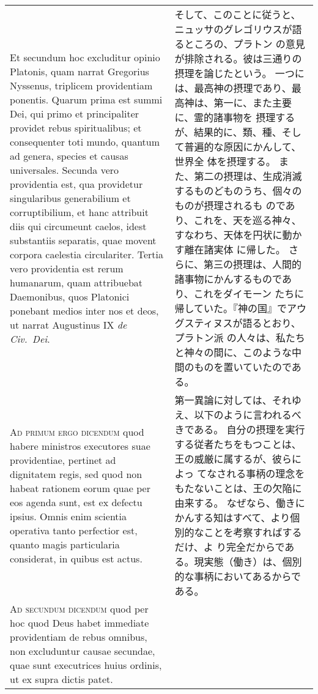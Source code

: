 \documentclass[10pt]{jsarticle} %
\begin{document}
\begin{longtable}{p{21em}p{21em}}
\\

Et secundum hoc
excluditur opinio Platonis, quam narrat Gregorius Nyssenus, triplicem
providentiam ponentis. Quarum prima est summi Dei, qui primo et
principaliter providet rebus spiritualibus; et consequenter toti mundo,
quantum ad genera, species et causas universales. Secunda vero
providentia est, qua providetur singularibus generabilium et
corruptibilium, et hanc attribuit diis qui circumeunt caelos, idest
substantiis separatis, quae movent corpora caelestia
circulariter. Tertia vero providentia est rerum humanarum, quam
attribuebat Daemonibus, quos Platonici ponebant medios inter nos et
deos, ut narrat Augustinus IX {\itshape de Civ.~Dei}.

&

そして、このことに従うと、ニュッサのグレゴリウスが語るところの、プラトン
 の意見が排除される。彼は三通りの摂理を論じたという。
一つには、最高神の摂理であり、最高神は、第一に、また主要に、霊的諸事物を
 摂理するが、結果的に、類、種、そして普遍的な原因にかんして、世界全
 体を摂理する。
また、第二の摂理は、生成消滅するものどものうち、個々のものが摂理されるも
 のであり、これを、天を巡る神々、すなわち、天体を円状に動かす離在諸実体
 に帰した。
さらに、第三の摂理は、人間的諸事物にかんするものであり、これをダイモーン
 たちに帰していた。『神の国』でアウグスティヌスが語るとおり、プラトン派
 の人々は、私たちと神々の間に、このような中間のものを置いていたのである。


\\


{\scshape Ad primum ergo dicendum} quod habere ministros
executores suae providentiae, pertinet ad dignitatem regis, sed quod non
habeat rationem eorum quae per eos agenda sunt, est ex defectu
ipsius. Omnis enim scientia operativa tanto perfectior est, quanto magis
particularia considerat, in quibus est actus.

&

第一異論に対しては、それゆえ、以下のように言われるべきである。
自分の摂理を実行する従者たちをもつことは、王の威厳に属するが、彼らによっ
 てなされる事柄の理念をもたないことは、王の欠陥に由来する。
なぜなら、働きにかんする知はすべて、より個別的なことを考察すればするだけ、よ
 り完全だからである。現実態（働き）は、個別的な事柄においてあるからである。


\\


{\scshape Ad secundum dicendum} quod per hoc quod Deus
habet immediate providentiam de rebus omnibus, non excluduntur causae
secundae, quae sunt executrices huius ordinis, ut ex supra dictis patet.


\end{longtable}
\end{document}
